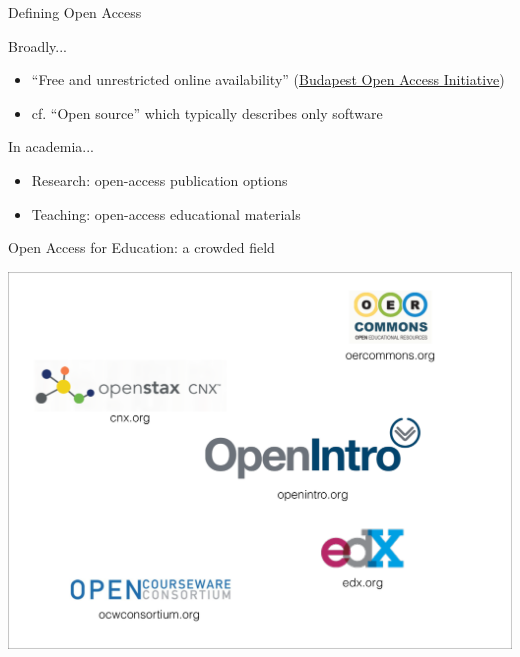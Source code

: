 \begin{frame}{Defining Open Access}

\begin{block}{Broadly...}
\begin{itemize}
        \item ``Free and unrestricted online availability'' (\href{http://www.budapestopenaccessinitiative.org/read}{Budapest Open Access Initiative})
        \item cf. ``Open source'' which typically describes only software
\end{itemize}
\end{block}

\begin{block}{In academia...}
\begin{itemize}
        \item Research: open-access publication options
        \item Teaching: open-access educational materials
\end{itemize}
\end{block}

\end{frame}


\begin{frame}{Open Access for Education: a crowded field}

\includegraphics[width=\linewidth]{openEdLogos}

\end{frame}


